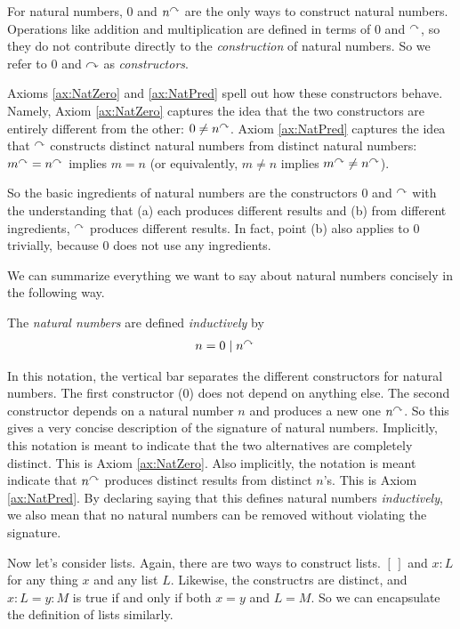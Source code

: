 For natural numbers, $0$ and $n^\curvearrowright$ are the only ways to construct
natural numbers. Operations like addition and multiplication are
defined in terms of $0$ and ${}^\curvearrowright$, so they do not contribute directly
to the \emph{construction} of natural numbers. So
we refer to $0$ and $\curvearrowright$ as \emph{constructors}.  

Axioms \ref{ax:NatZero} and \ref{ax:NatPred} spell out how these
constructors behave.  Namely, Axiom \ref{ax:NatZero} captures the idea that
the two constructors are entirely different from the other: $0\neq n^\curvearrowright$.
Axiom \ref{ax:NatPred} captures the idea that ${}^\curvearrowright$ constructs
distinct natural numbers from distinct natural numbers: $m^\curvearrowright =
n^\curvearrowright$ implies $m=n$ (or equivalently, $m\neq n$ implies $m^\curvearrowright\neq n^\curvearrowright$).

So the basic ingredients of natural numbers are the constructors $0$
and ${}^\curvearrowright$ with the understanding that (a) each produces
different results and (b) from different ingredients, ${}^\curvearrowright$
produces different results. In fact, point (b) also applies to $0$
trivially, because $0$ does not use any ingredients.

We can summarize everything we want to say about natural numbers
concisely in the following way.

\begin{defn}
  The \emph{natural numbers} are defined \emph{inductively} by
  \begin{align*}
    n &= 0 \mathrel{\mid} n^\curvearrowright
  \end{align*}
\end{defn}

In this notation, the vertical bar separates the different constructors for
natural numbers.  The first constructor ($0$) does not depend on
anything else. The second constructor depends on a natural number $n$
and produces a new one $n^\curvearrowright$. So this gives a very concise description of the signature of natural numbers.
Implicitly, this notation is meant to
indicate that the two alternatives are completely distinct. This is
Axiom \ref{ax:NatZero}.  Also implicitly, the notation is meant indicate that $n^\curvearrowright$
produces distinct results from distinct $n$'s.  This is Axiom
\ref{ax:NatPred}.  By declaring saying that this defines natural numbers
\emph{inductively}, we also mean that no natural numbers can be removed without violating
the signature.

Now let's consider lists. Again, there are two ways to construct lists. $[\,]$ and $x:L$ for any thing $x$
and any list $L$. Likewise, the constructrs are distinct, and $x:L=y:M$ is true if and only if
both $x=y$ and $L=M$. So we can encapsulate the definition of lists similarly.

